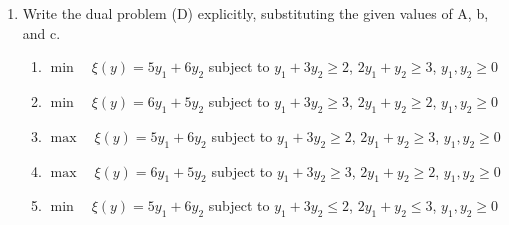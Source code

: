 \documentclass{article}%
\begin{document}
\begin{enumerate}
\begin{enumerate}%
\item Maximize $2y_1 + 3y_2$%
\item Maximize $10y_1 + 15y_2 + 20y_3$%
\item Minimize $10x_1 + 15x_2 + 20x_3$%
\item Maximize $y_1 + y_2 + y_3$%
\item Minimize $2x_1 + 3x_2$%
\end{enumerate}%
\vspace{1em}%
\item Write the dual problem (D) explicitly, substituting the given values of A, b, and c.%
\begin{enumerate}%
\item $\min \quad \xi(y) = 5y_1 + 6y_2$ subject to $y_1 + 3y_2 \ge 2$, $2y_1 + y_2 \ge 3$, $y_1, y_2 \ge 0$%
\item $\min \quad \xi(y) = 6y_1 + 5y_2$ subject to $y_1 + 3y_2 \ge 3$, $2y_1 + y_2 \ge 2$, $y_1, y_2 \ge 0$%
\item $\max \quad \xi(y) = 5y_1 + 6y_2$ subject to $y_1 + 3y_2 \ge 2$, $2y_1 + y_2 \ge 3$, $y_1, y_2 \ge 0$%
\item $\max \quad \xi(y) = 6y_1 + 5y_2$ subject to $y_1 + 3y_2 \ge 3$, $2y_1 + y_2 \ge 2$, $y_1, y_2 \ge 0$%
\item $\min \quad \xi(y) = 5y_1 + 6y_2$ subject to $y_1 + 3y_2 \le 2$, $2y_1 + y_2 \le 3$, $y_1, y_2 \ge 0$%
\end{enumerate}%
\vspace{1em}%
\end{enumerate}

%
\newpage%
\end{document}
